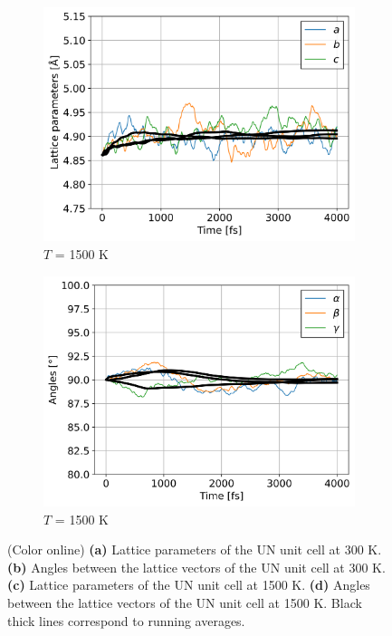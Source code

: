 \documentclass[preprint, 12pt]{elsarticle}
\newcommand{\?}{\stackrel{?}{=}}
\begin{document}
\begin{figure}[h!]
\begin{subfigure}{0.48\textwidth}
    \includegraphics[width=\textwidth]{LatConst-1500.png}
    \caption{$T$ = 1500 K}
    \label{Fig:LatConst-1500}
\end{subfigure}
\hfill
\begin{subfigure}{0.48\textwidth}
    \includegraphics[width=\textwidth]{Angles-1500.png}
    \caption{$T$ = 1500 K}
    \label{Fig:Angles-1500}
\end{subfigure}
\caption{(Color online) \textbf{(a)} Lattice parameters of the UN unit cell at 300 K. \textbf{(b)} Angles between the lattice vectors of the UN unit cell at 300 K. \textbf{(c)} Lattice parameters of the UN unit cell at 1500 K. \textbf{(d)} Angles between the lattice vectors of the UN unit cell at 1500 K. Black thick lines correspond to running averages.}
\label{Fig:UnitCell}
\end{figure}
\end{document}
